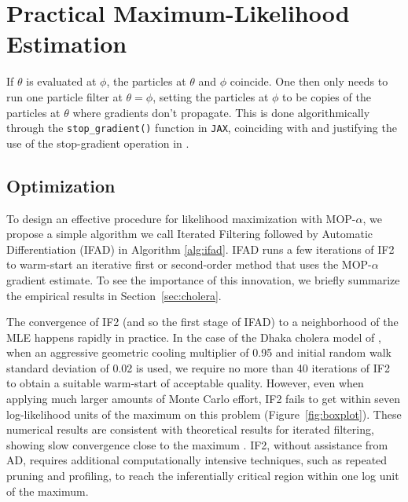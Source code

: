\documentclass[9pt,twocolumn,pnasresearcharticle]{pnas-new}
\newcommand\arxiv[2]{#2} %
\begin{document}
\arxiv{}{\vspace*{-2mm}}
\section{Practical Maximum-Likelihood Estimation}


If $\theta$ is evaluated at $\phi$, the particles at $\theta$ and $\phi$ coincide. One then only needs to run one particle filter at $\theta=\phi$, setting the particles at $\phi$ to be copies of the particles at $\theta$ where gradients don't propagate. This is done algorithmically through the \texttt{stop\_gradient()} function in \texttt{JAX}, coinciding with and justifying the use of the stop-gradient operation in \cite{scibior21}.

\arxiv{}{\vspace*{-2mm}}
\subsection{Optimization}

To design an effective procedure for likelihood maximization with MOP-$\alpha$, we propose a simple algorithm we call Iterated Filtering followed by Automatic Differentiation (IFAD) in Algorithm \ref{alg:ifad}. IFAD runs a few iterations of IF2 to warm-start an iterative first or second-order method that uses the MOP-$\alpha$ gradient estimate. 
To see the importance of this innovation, we briefly summarize the empirical results in Section~\ref{sec:cholera}.

The convergence of IF2 (and so the first stage of IFAD) to a neighborhood of the MLE happens rapidly in practice. 
In the case of the Dhaka cholera model of \cite{king08}, when an aggressive geometric cooling multiplier of 0.95 and initial random walk standard deviation of 0.02 is used, we require no more than 40 iterations of IF2 to obtain a suitable warm-start of acceptable quality. 
However, even when applying much larger amounts of Monte Carlo effort, IF2 fails to get within seven log-likelihood units of the maximum on this problem (Figure~\ref{fig:boxplot}).
These numerical results are consistent with theoretical results for iterated filtering, showing slow convergence close to the maximum \cite{doucet15-if}.
IF2, without assistance from AD, requires additional computationally intensive techniques, such as repeated pruning and profiling, to reach the inferentially critical region within one log unit of the maximum.
\end{document}
